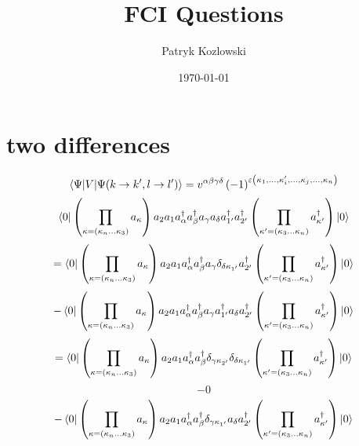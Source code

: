 \documentclass[12pt]{article}
\title{FCI Questions}
\author{Patryk Kozlowski}
\date{\today}
\begin{document}
\maketitle
\section{two differences}
\begin{equation}
    \mel{\Psi }{V}{\Psi (k\rightarrow k^{\prime}, l\rightarrow l^{\prime})}=v^{\alpha\beta\gamma\delta}\left(-1\right)^{\varepsilon\left(\kappa_{1},\dots,\kappa_{i}^{\prime},\dots,\kappa _{j},...,\kappa_{n}\right)}\\
\end{equation}
\begin{equation}
    \bra{0}\left(\prod_{\kappa=\left(\kappa_{n}\dots\kappa_{3}\right)}a_{\kappa}\right)
        a_{2}a_{1}a^{\dag}_{\alpha }a^{\dag}_{\beta }a_{\gamma }a_{\delta }a^{\dag}_{1^{\prime}}a^{\dag}_{2^{\prime}}
    \left(\prod_{\kappa^{\prime}=\left(\kappa_{3}\dots\kappa_{n}\right)}a^{\dag}_{\kappa^{\prime}}\right)\ket{0}
\end{equation}
\begin{equation}
    =\bra{0}\left(\prod_{\kappa=\left(\kappa_{n}\dots\kappa_{3}\right)}a_{\kappa}\right)
        a_{2}a_{1}a^{\dag}_{\alpha }a^{\dag}_{\beta }a_{\gamma }\delta _{\delta  \kappa _{1^{\prime}}}a^{\dag}_{2^{\prime}}
    \left(\prod_{\kappa^{\prime}=\left(\kappa_{3}\dots\kappa_{n}\right)}a^{\dag}_{\kappa^{\prime}}\right)\ket{0}
\end{equation}
\begin{equation}
    -\bra{0}\left(\prod_{\kappa=\left(\kappa_{n}\dots\kappa_{3}\right)}a_{\kappa}\right)
        a_{2}a_{1}a^{\dag}_{\alpha }a^{\dag}_{\beta }a_{\gamma }a^{\dag}_{1^{\prime}}a_{\delta }a^{\dag}_{2^{\prime}}
    \left(\prod_{\kappa^{\prime}=\left(\kappa_{3}\dots\kappa_{n}\right)}a^{\dag}_{\kappa^{\prime}}\right)\ket{0}
\end{equation}
\begin{equation}
    =\bra{0}\left(\prod_{\kappa=\left(\kappa_{n}\dots\kappa_{3}\right)}a_{\kappa}\right)
        a_{2}a_{1}a^{\dag}_{\alpha }a^{\dag}_{\beta }\delta _{\gamma  \kappa _{2^{\prime}}}\delta _{\delta  \kappa _{1^{\prime}}}
    \left(\prod_{\kappa^{\prime}=\left(\kappa_{3}\dots\kappa_{n}\right)}a^{\dag}_{\kappa^{\prime}}\right)\ket{0}
\end{equation}
\begin{equation}
    -0
\end{equation}
\begin{equation}
    -\bra{0}\left(\prod_{\kappa=\left(\kappa_{n}\dots\kappa_{3}\right)}a_{\kappa}\right)
        a_{2}a_{1}a^{\dag}_{\alpha }a^{\dag}_{\beta }\delta _{\gamma  \kappa _{1^{\prime}}}a_{\delta }a^{\dag}_{2^{\prime}}
    \left(\prod_{\kappa^{\prime}=\left(\kappa_{3}\dots\kappa_{n}\right)}a^{\dag}_{\kappa^{\prime}}\right)\ket{0}
\end{equation}
\end{document}
